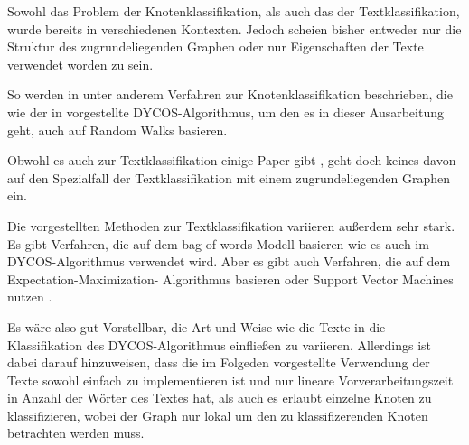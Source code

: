 Sowohl das Problem der Knotenklassifikation, als auch das der
Textklassifikation, wurde bereits in verschiedenen Kontexten. Jedoch scheien
bisher entweder nur die Struktur des zugrundeliegenden Graphen oder nur
Eigenschaften der Texte verwendet worden zu sein.

So werden in \cite{bhagat,szummer} unter anderem Verfahren zur
Knotenklassifikation beschrieben, die wie der in \cite{aggarwal2011}
vorgestellte DYCOS-Algorithmus, um den es in dieser Ausarbeitung geht, auch auf
Random Walks basieren.

Obwohl es auch zur Textklassifikation einige Paper gibt
\cite{Zhu02learningfrom,Jiang2010302}, geht doch keines davon auf den
Spezialfall der Textklassifikation mit einem zugrundeliegenden Graphen ein.

Die vorgestellten Methoden zur Textklassifikation variieren außerdem sehr
stark. Es gibt Verfahren, die auf dem bag-of-words-Modell basieren
\cite{Ko:2012:STW:2348283.2348453} wie es auch im DYCOS-Algorithmus verwendet
wird. Aber es gibt auch Verfahren, die auf dem Expectation-Maximization-
Algorithmus basieren \cite{Nigam99textclassification} oder Support Vector
Machines nutzen \cite{Joachims98textcategorization}.

Es wäre also gut Vorstellbar, die Art und Weise wie die Texte in die
Klassifikation des DYCOS-Algorithmus einfließen zu variieren. Allerdings ist
dabei darauf hinzuweisen, dass die im Folgeden vorgestellte Verwendung der
Texte sowohl einfach zu implementieren ist und nur lineare Vorverarbeitungszeit
in Anzahl der Wörter des Textes hat, als auch es erlaubt einzelne Knoten zu
klassifizieren, wobei der Graph nur lokal um den zu klassifizerenden Knoten
betrachten werden muss.
